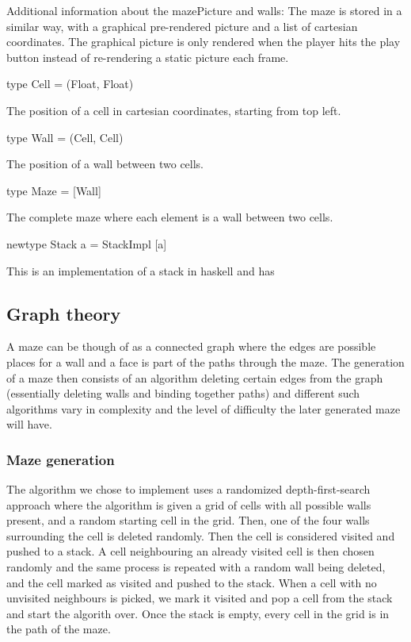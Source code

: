 \documentclass[12pt, a4paper]{article}
\begin{document}
Additional information about the mazePicture and walls:
The maze is stored in a similar way, with a graphical pre-rendered picture and a list of cartesian coordinates. The graphical picture is only rendered when the player hits the play button instead of re-rendering a static picture each frame.

\begin{code}
type Cell = (Float, Float)
\end{code}
The position of a cell in cartesian coordinates, starting from top left.

\begin{code}
type Wall = (Cell, Cell)
\end{code}
The position of a wall between two cells.

\begin{code}
type Maze = [Wall]
\end{code}
The complete maze where each element is a wall between two cells.

\begin{code}
newtype Stack a = StackImpl [a]
\end{code}
This is an implementation of a stack in haskell and has 

\subsection{Graph theory}
A maze can be though of as a connected graph where the edges are possible places for a wall and a face is part of the paths through the maze. The generation of a maze then consists of an algorithm deleting certain edges from the graph (essentially deleting walls and binding together paths) and different such algorithms vary in complexity and the level of difficulty the later generated maze will have. 


\subsubsection*{Maze generation}
The algorithm we chose to implement uses a randomized depth-first-search approach where the algorithm is given a grid of cells with all possible walls present, and a random starting cell in the grid. Then, one of the four walls surrounding the cell is deleted randomly. Then the cell is considered visited and pushed to a stack. A cell neighbouring an already visited cell is then chosen randomly and the same process is repeated with a random wall being deleted, and the cell marked as visited and pushed to the stack. When a cell with no unvisited neighbours is picked, we mark it visited and pop a cell from the stack and start the algorith over. Once the stack is empty, every cell in the grid is in the path of the maze. \cite{maze}
\end{document}
